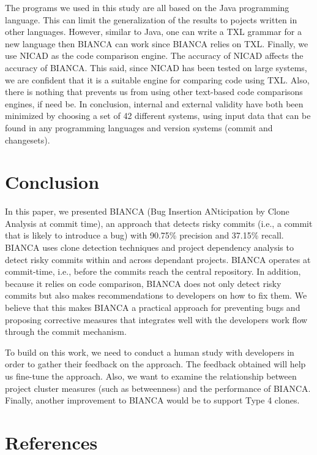 \documentclass[conference]{IEEEtran}
\begin{document}
The programs we used in this study are all based on the Java programming
language. This can limit the generalization of the results to pojects
written in other languages. However, similar to Java, one can write a
TXL grammar for a new language then BIANCA can work since BIANCA relies
on TXL. Finally, we use NICAD as the code comparison engine. The
accuracy of NICAD affects the accuracy of BIANCA. This said, since NICAD
has been tested on large systems, we are confident that it is a suitable
engine for comparing code using TXL. Also, there is nothing that
prevents us from using other text-based code comparisons engines, if
need be. In conclusion, internal and external validity have both been
minimized by choosing a set of 42 different systems, using input data
that can be found in any programming languages and version systems
(commit and changesets).

\section{Conclusion}\label{sec:conclusion}

In this paper, we presented BIANCA (Bug Insertion ANticipation by Clone
Analysis at commit time), an approach that detects risky commits (i.e.,
a commit that is likely to introduce a bug) with 90.75\% precision and
37.15\% recall. BIANCA uses clone detection techniques and project
dependency analysis to detect risky commits within and across dependant
projects. BIANCA operates at commit-time, i.e., before the commits reach
the central repository. In addition, because it relies on code
comparison, BIANCA does not only detect risky commits but also makes
recommendations to developers on how to fix them. We believe that this
makes BIANCA a practical approach for preventing bugs and proposing
corrective measures that integrates well with the developers work flow
through the commit mechanism.

To build on this work, we need to conduct a human study with developers
in order to gather their feedback on the approach. The feedback obtained
will help us fine-tune the approach. Also, we want to examine the
relationship between project cluster measures (such as betweenness) and
the performance of BIANCA. Finally, another improvement to BIANCA would
be to support Type 4 clones.

\newpage

\section{References}\label{references}

\small


\end{document}
